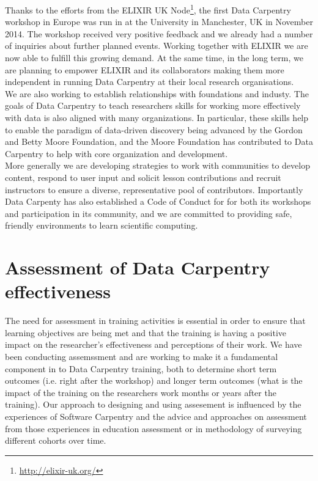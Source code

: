 \documentclass[15]{idcc}
\begin{document}
\begin{itemize}
Thanks to the efforts from the ELIXIR UK Node\footnote{\url{http://elixir-uk.org/}}, the first Data Carpentry workshop in Europe was run in at the University in Manchester, UK
in November 2014. The workshop received very positive feedback and we already had a number of inquiries about further planned events. Working together with ELIXIR we are now
able to fulfill this growing demand. At the same time, in the long term, we are planning to empower ELIXIR and its collaborators making them more independent in running
Data Carpentry at their local research organisations. \\

We are also working to establish relationships with foundations and industy. The goals of Data Carpentry to teach researchers skills for working more effectively with data is also aligned with many organizations. In particular, these skills help to enable the paradigm of data-driven discovery being advanced 
by the Gordon and Betty Moore Foundation, and the Moore Foundation has contributed to Data Carpentry to help with core organization
and development. \\

More generally we are developing strategies to work with communities to develop content, respond to user input and solicit lesson contributions and
 recruit instructors to ensure a diverse, representative pool of contributors. Importantly Data Carpenty has also established a Code of Conduct for
 for both its workshops and participation in its community, and we are committed to providing safe, friendly environments to learn scientific computing.


\section{Assessment of Data Carpentry effectiveness}
The need for assessment in training activities is essential in order to ensure that learning objectives are being met and that the
training is having a positive impact on the researcher's effectiveness and perceptions of their work. We have been conducting
assemssment and are working to make it a fundamental component in to Data Carpentry training, both to determine short term outcomes
(i.e. right after
the workshop) and longer term outcomes (what is the impact of the training on the researchers work months or years after the
training). Our approach to designing and using assesement is influenced by
the experiences of Software Carpentry and the advice and approaches on assessment from those experiences in education assessment or
in methodology of surveying different cohorts over time. \\


\end{itemize}
\end{document}

